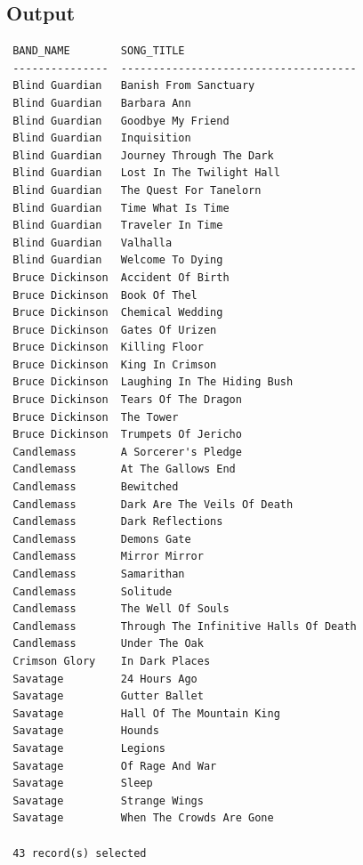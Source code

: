 \documentclass{report}
\begin{document}
\subsection*{Output}
\begin{verbatim}
 BAND_NAME        SONG_TITLE                            
 ---------------  ------------------------------------- 
 Blind Guardian   Banish From Sanctuary                 
 Blind Guardian   Barbara Ann                           
 Blind Guardian   Goodbye My Friend                     
 Blind Guardian   Inquisition                           
 Blind Guardian   Journey Through The Dark              
 Blind Guardian   Lost In The Twilight Hall             
 Blind Guardian   The Quest For Tanelorn                
 Blind Guardian   Time What Is Time                     
 Blind Guardian   Traveler In Time                      
 Blind Guardian   Valhalla                              
 Blind Guardian   Welcome To Dying                      
 Bruce Dickinson  Accident Of Birth                     
 Bruce Dickinson  Book Of Thel                          
 Bruce Dickinson  Chemical Wedding                      
 Bruce Dickinson  Gates Of Urizen                       
 Bruce Dickinson  Killing Floor                         
 Bruce Dickinson  King In Crimson                       
 Bruce Dickinson  Laughing In The Hiding Bush           
 Bruce Dickinson  Tears Of The Dragon                   
 Bruce Dickinson  The Tower                             
 Bruce Dickinson  Trumpets Of Jericho                   
 Candlemass       A Sorcerer's Pledge                   
 Candlemass       At The Gallows End                    
 Candlemass       Bewitched                             
 Candlemass       Dark Are The Veils Of Death           
 Candlemass       Dark Reflections                      
 Candlemass       Demons Gate                           
 Candlemass       Mirror Mirror                         
 Candlemass       Samarithan                            
 Candlemass       Solitude                              
 Candlemass       The Well Of Souls                     
 Candlemass       Through The Infinitive Halls Of Death 
 Candlemass       Under The Oak                         
 Crimson Glory    In Dark Places                        
 Savatage         24 Hours Ago                          
 Savatage         Gutter Ballet                         
 Savatage         Hall Of The Mountain King             
 Savatage         Hounds                                
 Savatage         Legions                               
 Savatage         Of Rage And War                       
 Savatage         Sleep                                 
 Savatage         Strange Wings                         
 Savatage         When The Crowds Are Gone              

 43 record(s) selected
\end{verbatim}
\end{document}
